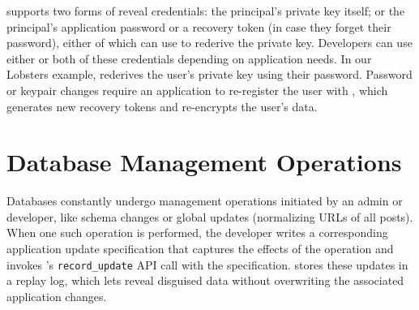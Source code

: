 %
\sys supports two forms of reveal credentials: \one{} the principal's private key
itself; or \two{} the principal's application password or a recovery
token (in case they forget their password), either of which \sys can use to rederive
the private key.
%
Developers can use either or both of these credentials depending on application needs.
%
In our Lobsters example, \sys rederives the user's private key using their password.
%
%
%
Password or keypair changes require an application to re-register the user with
\sys, which generates new recovery tokens and re-encrypts the user's \xxed data.
%
%
%
%

%
%

\section{Database Management Operations} 
\label{s:overview:updates}

Databases constantly undergo management operations initiated by an admin or
developer, like schema changes or global updates (\eg normalizing URLs of all
posts). When one such operation is performed, the developer writes a
corresponding application update specification that captures the effects of the
operation and invokes \sys's \texttt{record\_update} API call with the
specification. \sys stores these updates in a replay log, which lets \sys reveal
disguised data without overwriting the associated application changes.
%
%

